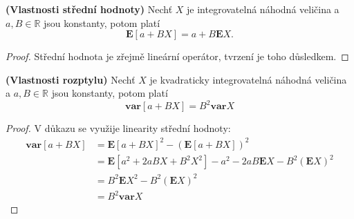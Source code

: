\begin{theorem}{\textbf{(Vlastnosti střední hodnoty)}}
Nechť $X$ je integrovatelná náhodná veličina a $a, B \in \mathbb{R}$ jsou konstanty, potom platí
\begin{equation}
\mathbf{E}[a + BX] = a + B\mathbf{E}X.
\end{equation}
\end{theorem}
\begin{proof}
Střední hodnota je zřejmě lineární operátor, tvrzení je toho důsledkem.
\end{proof}

\begin{theorem}{\textbf{(Vlastnosti rozptylu)}}
Nechť $X$ je kvadraticky integrovatelná náhodná veličina a $a, B \in \mathbb{R}$ jsou konstanty, potom platí
\begin{equation}
\mathbf{var}[a + BX] = B^{2}\mathbf{var}X
\end{equation}
\end{theorem}
\begin{proof}
V důkazu se využije linearity střední hodnoty:
\begin{align*}
\mathbf{var}[a + BX] &= \mathbf{E}[a + BX]^{2} - (\mathbf{E}[a + BX])^{2} \\
&= \mathbf{E}[a^{2} + 2aBX + B^{2}X^{2}] - a^{2} - 2aB\mathbf{E}X - B^{2}(\mathbf{E}X)^{2} \\
&= B^{2}\mathbf{E}X^{2} - B^{2}(\mathbf{E}X)^{2} \\
&= B^{2}\mathbf{var}X
\end{align*}
\end{proof}

